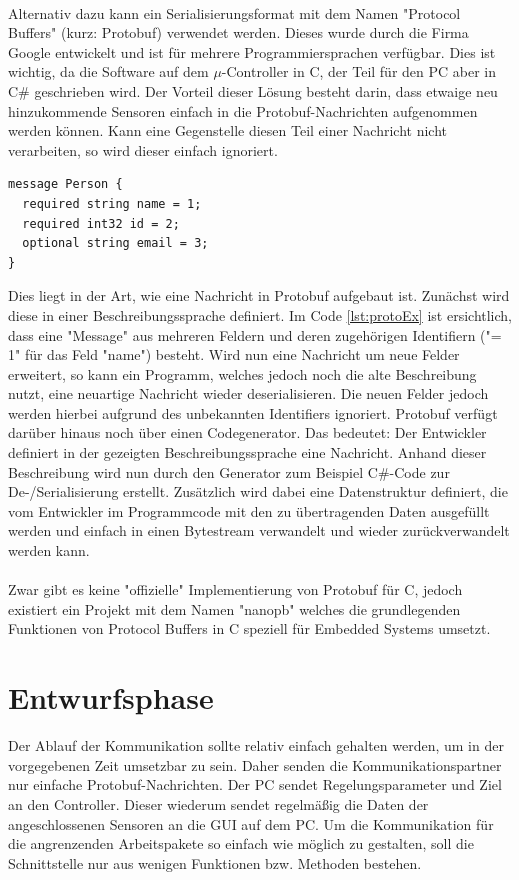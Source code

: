 \paragraph{}
Alternativ dazu kann ein Serialisierungsformat mit dem Namen "Protocol Buffers" (kurz: Protobuf)  verwendet werden. Dieses wurde durch die Firma Google entwickelt und ist für mehrere Programmiersprachen verfügbar. Dies ist wichtig, da die Software auf dem $\mu$-Controller in C, der Teil für den PC aber in C\# geschrieben wird. Der Vorteil dieser Lösung besteht darin, dass etwaige neu hinzukommende Sensoren einfach in die Protobuf-Nachrichten aufgenommen werden können. Kann eine Gegenstelle diesen Teil einer Nachricht nicht verarbeiten, so wird dieser einfach ignoriert.
\pagebreak
\begin{lstlisting}[caption=Beispieldefinition einer Protocol Buffers Nachricht, label=lst:protoEx]
message Person {
  required string name = 1;
  required int32 id = 2;
  optional string email = 3;
}
\end{lstlisting}
Dies liegt in der Art, wie eine Nachricht in Protobuf aufgebaut ist. Zunächst wird diese in einer Beschreibungssprache definiert.
Im Code \ref{lst:protoEx} ist ersichtlich, dass eine "Message" aus mehreren Feldern und deren zugehörigen Identifiern ("= 1" für das Feld "name") besteht. Wird nun eine Nachricht um neue Felder erweitert, so kann ein Programm, welches jedoch noch die alte Beschreibung nutzt, eine neuartige Nachricht wieder deserialisieren. Die neuen Felder jedoch werden hierbei aufgrund des unbekannten Identifiers ignoriert. Protobuf verfügt darüber hinaus noch über einen Codegenerator. Das bedeutet: Der Entwickler definiert in der gezeigten Beschreibungssprache eine Nachricht. Anhand dieser Beschreibung wird nun durch den Generator zum Beispiel C\#-Code zur De-/Serialisierung erstellt. Zusätzlich wird dabei eine Datenstruktur definiert, die vom Entwickler im Programmcode mit den zu übertragenden Daten ausgefüllt werden und einfach in einen Bytestream verwandelt und wieder zurückverwandelt werden kann.
\paragraph{}
Zwar gibt es keine "offizielle" Implementierung von Protobuf für C, jedoch existiert ein Projekt mit dem Namen "nanopb" welches die grundlegenden Funktionen von Protocol Buffers in C speziell für Embedded Systems umsetzt.
\section{Entwurfsphase}
Der Ablauf der Kommunikation sollte relativ einfach gehalten werden, um in der vorgegebenen Zeit umsetzbar zu sein. Daher senden die Kommunikationspartner nur einfache Protobuf-Nachrichten. Der PC sendet Regelungsparameter und Ziel an den Controller. Dieser wiederum sendet regelmäßig die Daten der angeschlossenen Sensoren an die GUI auf dem PC. Um die Kommunikation für die angrenzenden Arbeitspakete so einfach wie möglich zu gestalten, soll die Schnittstelle nur aus wenigen Funktionen bzw. Methoden bestehen.
